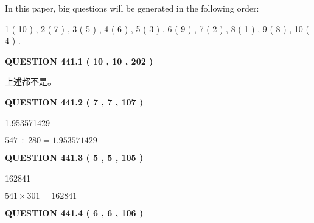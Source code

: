 \documentclass{ctexart}
\begin{document}
   
   
\vspace{0.2in}
   
In this paper, big questions will be generated in the following order: 
   
   
   1 ( 10 )
 ,
   2 ( 7 )
 ,
   3 ( 5 )
 ,
   4 ( 6 )
 ,
   5 ( 3 )
 ,
   6 ( 9 )
 ,
   7 ( 2 )
 ,
   8 ( 1 )
 ,
   9 ( 8 )
 ,
   10 ( 4 )
 .
  
\vspace{0.2in}
  
{\textbf{\Large{QUESTION
441.1 
 ( 10 , 10 , 202 )
}}}
  
  
 
 
\noindent{}
 
 
 上述都不是。
 
 
 
 
  
\vspace{0.2in}
  
{\textbf{\Large{QUESTION
441.2 
 ( 7 , 7 , 107 )
}}}
  
  
 
 
\noindent{}

1.953571429
 
 
 
 
\noindent{}

$ %
547 \div  %
280=   %
1.953571429$
 
 
  
\vspace{0.2in}
  
{\textbf{\Large{QUESTION
441.3 
 ( 5 , 5 , 105 )
}}}
  
  
 
 
\noindent{}

162841
 
 
 
 
\noindent{}

$ %
541 \times  %
301=   %
162841$
 
 
  
\vspace{0.2in}
  
{\textbf{\Large{QUESTION
441.4 
 ( 6 , 6 , 106 )
}}}
  
\end{document}
